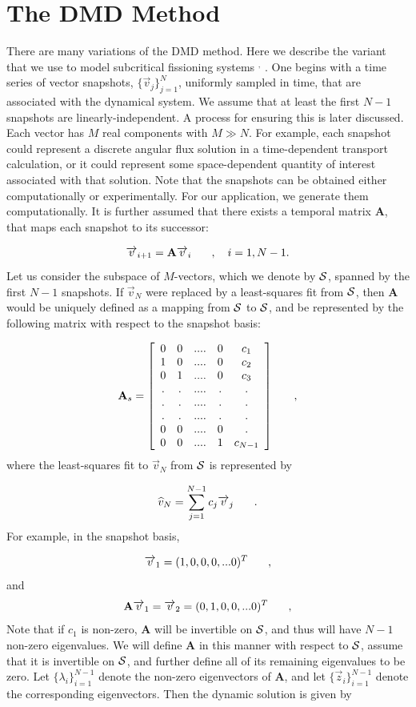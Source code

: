 \documentclass[12pt]{article}
\newcommand{\bracket}[1]{\left[ #1 \right]}
\renewcommand{\vec}[1]{\overrightarrow{#1}}
\newcommand{\be}{\begin{equation}}
\newcommand{\ee}{\end{equation}}
\newcommand{\pec}{\hspace{0.25in},}
\newcommand{\pep}{\hspace{0.25in}.}
\newcommand{\LEQ}[1]{\label{eq:#1}}
\newcommand{\cS}{{\cal S}}
\newcommand{\mA}{\mathbf{A}}
\begin{document}
\section{The DMD Method}
There are many variations of the DMD method.  
Here we describe the variant that we use to model subcritical fissioning 
	systems \cite{dmd2016}$^,$\cite{schmid2010} .
One begins with a time series of vector snapshots, $\{\vec{v}_j\}_{j=1}^{N}$, 
	uniformly sampled in time, that are associated with the dynamical system. 
We assume that at least the first $N-1$ snapshots are linearly-independent. 
A process for ensuring this is later discussed.  
Each vector has $M$ real components with $M \gg N$. 
For example, each snapshot could represent a discrete angular flux solution in 
	a time-dependent transport calculation, or it could represent some 
	space-dependent quantity of interest associated with that solution.  
Note that the snapshots can be obtained either computationally or 
	experimentally. 
For our application, we generate them computationally. 
It is further assumed that there exists a temporal matrix $\mathbf{A}$, that 
	maps each snapshot to its successor:

\be
	\vec{v}_{i+1} = \mA \vec{v}_{i} \pec \quad i=1,N-1.
	\LEQ{2.1}
\ee
Let us consider the subspace of $M$-vectors, which we denote by $\cS$, spanned 
	by the first $N-1$ snapshots.  
If $\vec{v}_N$ were replaced by a least-squares fit from $\cS$, then $\mA$ 
	would be uniquely defined as a mapping from $\cS$ to $\cS$, and be 
	represented by the following matrix with respect to the snapshot basis:

\be
	\mA_s = \bracket{
	\begin{array}{ccccccc}
		0 & 0 & ....& 0 & c_1 \\
		1 & 0 & ....& 0 & c_2 \\
		0 & 1 & ....& 0 & c_3 \\
		. & . & ....& . & . \\
		. & . & ....& . & . \\
		. & . & ....& . & . \\
		0 & 0 & ....& 0 & . \\
		0 & 0 & ....& 1 & c_{N-1}
	\end{array}
	} \pec
	\LEQ{2.2}
\ee
where the least-squares fit to $\vec{v}_N$ from $\cS$ is represented by

\be
	\widehat{v}_N = \sum_{j=1}^{N-1} c_j \vec{v}_j \pep
	\LEQ{2.3}
\ee
For example, in the snapshot basis,

\be
	\vec{v}_1 = (1,0,0,0,...0)^T \pec
	\LEQ{2.4}
\ee
and 
\be
	\mA \vec{v}_1 = \vec{v}_2 = (0,1,0,0,...0)^T \pec
	\LEQ{2.5}
\ee
Note that if $c_1$ is non-zero, $\mA$ will be invertible on $\cS$, and thus 		
	will have $N-1$ non-zero eigenvalues. 
We will define $\mA$ in this manner with respect to $\cS$, assume that it is 
	invertible on $\cS$, and further define all of its remaining eigenvalues to 
	be zero.  
Let $\{\lambda_i\}_{i=1}^{N-1}$ denote the non-zero eigenvectors of $\mA$, and 
	let $\{\vec{z}_i\}_{i=1}^{N-1}$ denote the corresponding eigenvectors. 
Then the dynamic solution is given by 
\end{document}
